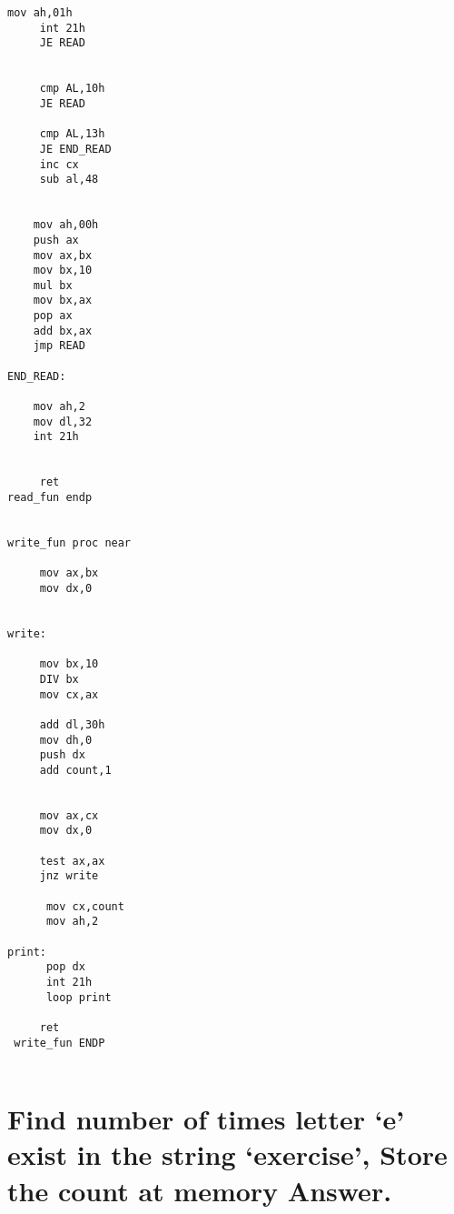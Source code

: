 \documentclass{article}
\begin{document}
\begin{lstlisting}[style=asmStyle]
     mov ah,01h
     int 21h
     JE READ
   
   
     cmp AL,10h 
     JE READ
    
     cmp AL,13h
     JE END_READ
     inc cx
     sub al,48 
    
    
    mov ah,00h
    push ax
    mov ax,bx
    mov bx,10
    mul bx
    mov bx,ax
    pop ax
    add bx,ax
    jmp READ
    
END_READ:
   
    mov ah,2
    mov dl,32 
    int 21h
   
    
     ret
read_fun endp 


write_fun proc near
     
     mov ax,bx
     mov dx,0 
       
     
write:
    
     mov bx,10
     DIV bx 
     mov cx,ax
     
     add dl,30h 
     mov dh,0  
     push dx
     add count,1
     
     
     mov ax,cx
     mov dx,0
     
     test ax,ax
     jnz write  
          
      mov cx,count
      mov ah,2  
      
print:
      pop dx
      int 21h 
      loop print
     
     ret
 write_fun ENDP 


\end{lstlisting}


\section{Find number of times letter ‘e’ exist in the string ‘exercise’, Store the count at
memory Answer.} 
\end{document}

